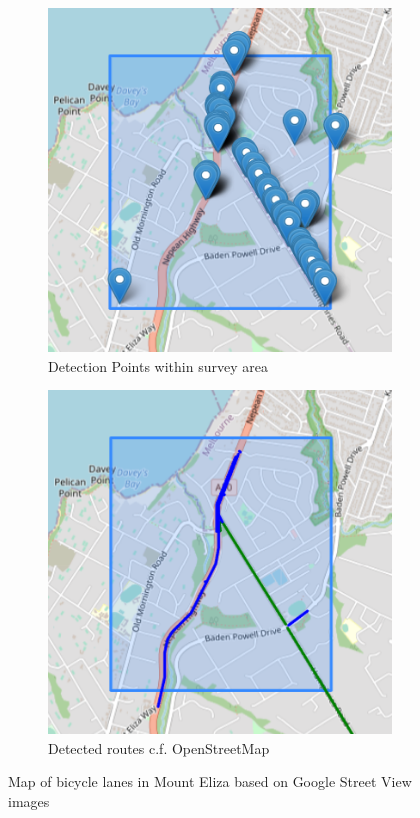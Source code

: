\documentclass[11pt,twoside]{report}
\begin{document}
\begin{figure}[h]
\centering
\begin{subfigure}{0.45\textwidth}
	\includegraphics[width=\textwidth]{map1_1.png}
	\caption{Detection Points within survey area}
	\label{fig:rq2a}
\end{subfigure}
\hfill
\begin{subfigure}{0.45\textwidth}
	\includegraphics[width=\textwidth]{map1_4.png}
	\caption{Detected routes c.f. OpenStreetMap}
	\label{fig:rq2b}
\end{subfigure}
\caption{Map of bicycle lanes in Mount Eliza based on Google Street View images}
\label{fig:rq2}
\end{figure}
\end{document}
